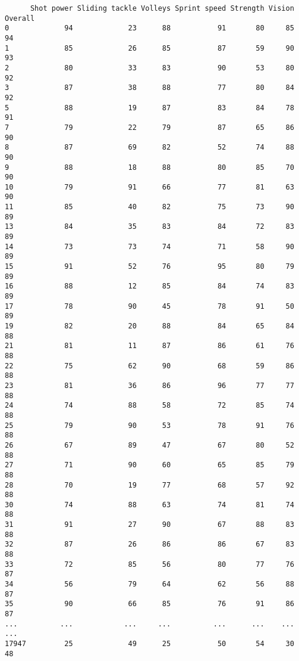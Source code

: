 \documentclass[11pt]{article}
\begin{document}
\begin{verbatim}
      Shot power Sliding tackle Volleys Sprint speed Strength Vision Overall  
0             94             23      88           91       80     85      94  
1             85             26      85           87       59     90      93  
2             80             33      83           90       53     80      92  
3             87             38      88           77       80     84      92  
5             88             19      87           83       84     78      91  
7             79             22      79           87       65     86      90  
8             87             69      82           52       74     88      90  
9             88             18      88           80       85     70      90  
10            79             91      66           77       81     63      90  
11            85             40      82           75       73     90      89  
13            84             35      83           84       72     83      89  
14            73             73      74           71       58     90      89  
15            91             52      76           95       80     79      89  
16            88             12      85           84       74     83      89  
17            78             90      45           78       91     50      89  
19            82             20      88           84       65     84      88  
21            81             11      87           86       61     76      88  
22            75             62      90           68       59     86      88  
23            81             36      86           96       77     77      88  
24            74             88      58           72       85     74      88  
25            79             90      53           78       91     76      88  
26            67             89      47           67       80     52      88  
27            71             90      60           65       85     79      88  
28            70             19      77           68       57     92      88  
30            74             88      63           74       81     74      88  
31            91             27      90           67       88     83      88  
32            87             26      86           86       67     83      88  
33            72             85      56           80       77     76      87  
34            56             79      64           62       56     88      87  
35            90             66      85           76       91     86      87  
...          ...            ...     ...          ...      ...    ...     ...  
17947         25             49      25           50       54     30      48  

\end{verbatim}
\end{document}
